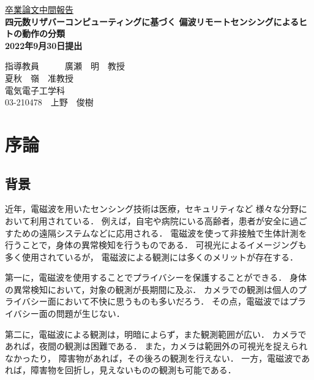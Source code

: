 \documentclass[uplatex,a4paper,10pt]{jsarticle}
\begin{document}
\begin{center}
\vspace*{3cm} \underline{\HUGE 卒業論文中間報告 }\\
\vspace{1cm}
\bf{ \Huge 四元数リザバーコンピューティングに基づく
偏波リモートセンシングによるヒトの動作の分類\\}
\vspace{3cm}
\huge 2022年9月30日提出 \\
\vspace{3cm}
\end{center}
\begin{minipage}{0.4\hsize}
\hspace{1zw}
\end{minipage}
\begin{center}
\begin{minipage}{0.7\hsize}
{\huge 指導教員　　　廣瀬　明　教授\\ 夏秋　嶺　准教授}
\vspace{1cm}\\
\centering
{\huge 電気電子工学科\\}
{\huge 03-210478　上野　俊樹}
\end{minipage}
\end{center}


\newpage
\tableofcontents

\newpage 

\section{序論}
\subsection{背景}
近年，電磁波を用いたセンシング技術は医療，セキュリティなど
様々な分野において利用されている．
例えば，自宅や病院にいる高齢者，患者が安全に過ごすための遠隔システムなどに応用される．
電磁波を使って非接触で生体計測を行うことで，身体の異常検知を行うものである．
可視光によるイメージングも多く使用されているが，
電磁波による観測には多くのメリットが存在する．

第一に，電磁波を使用することでプライバシーを保護することができる．
身体の異常検知において，対象の観測が長期間に及ぶ．
カメラでの観測は個人のプライバシー面において不快に思うものも多いだろう．
その点，電磁波ではプライバシー面の問題が生じない．

第二に，電磁波による観測は，明暗によらず，また観測範囲が広い．
カメラであれば，夜間の観測は困難である．
また，カメラは範囲外の可視光を捉えられなかったり，
障害物があれば，その後ろの観測を行えない．
一方，電磁波であれば，障害物を回折し，見えないものの観測も可能である．
\end{document}
